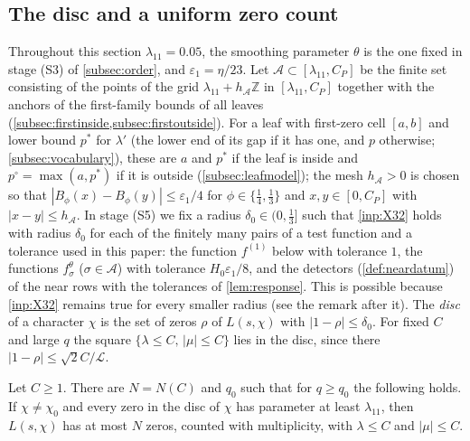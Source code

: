 \documentclass[11pt]{amsart}
\numberwithin{equation}{section}
\theoremstyle{plain}
\theoremstyle{definition}
\theoremstyle{remark}
\newcommand{\LL}{\mathcal{L}}
\newcommand{\ZZ}{\mathbb{Z}}
\newcommand{\eps}{\varepsilon}
\newcommand{\1}{\mathbf{1}}
\begin{document}
\subsection{The disc and a uniform zero count}\label{subsec:zerocount}
Throughout this section $\lambda_{11}=0.05$, the smoothing parameter $\theta$ is the one fixed in stage
(S3) of \cref{subsec:order}, and $\eps_1=\eta/23$. Let $\mathcal A\subset[\lambda_{11},C_P]$ be the finite set
consisting of the points of the grid $\lambda_{11}+h_{\mathcal A}\ZZ$ in $[\lambda_{11},C_P]$ together with the
anchors of the first-family bounds of all leaves (\cref{subsec:firstinside,subsec:firstoutside}). For a leaf
with first-zero cell $[a,b]$ and lower bound $p^*$ for $\lambda'$ (the lower end of its gap if it has
one, and $p$ otherwise; \cref{subsec:vocabulary}), these are $a$ and $p^*$ if the leaf is inside and
$p^\circ=\max(a,p^*)$ if it is outside (\cref{subsec:leafmodel});
the mesh $h_{\mathcal A}>0$ is chosen so that $|B_\phi(x)-B_\phi(y)|\le\eps_1/4$ for $\phi\in\{\frac14,\frac13\}$
and $x,y\in[0,C_P]$ with $|x-y|\le h_{\mathcal A}$. In stage (S5) we fix a radius $\delta_0\in(0,\frac13]$ such
that \cref{inp:X32} holds with radius $\delta_0$ for each of the finitely many pairs of a test
function and a tolerance used in this paper: the function $f^{(1)}$ below with tolerance $1$, the
functions $f^\theta_\sigma$ ($\sigma\in\mathcal A$) with tolerance $H_0\eps_1/8$, and the detectors (\cref{def:neardatum}) of the near
rows with the tolerances of \cref{lem:response}. This is possible because \cref{inp:X32} remains
true for every smaller radius (see the remark after it). The \emph{disc} of a character $\chi$ is the
set of zeros $\rho$ of $L(s,\chi)$ with $|1-\rho|\le\delta_0$. For fixed $C$ and large $q$ the square
$\{\lambda\le C,\,|\mu|\le C\}$ lies in the disc, since there $|1-\rho|\le\sqrt2C/\LL$.

\begin{lemma}\label{lem:zerocount}
Let $C\ge1$. There are $N=N(C)$ and $q_0$ such that for $q\ge q_0$ the following holds. If
$\chi\ne\chi_0$ and every zero in the disc of $\chi$ has parameter at least $\lambda_{11}$, then $L(s,\chi)$
has at most $N$ zeros, counted with multiplicity, with $\lambda\le C$ and $|\mu|\le C$.
\end{lemma}
\end{document}
